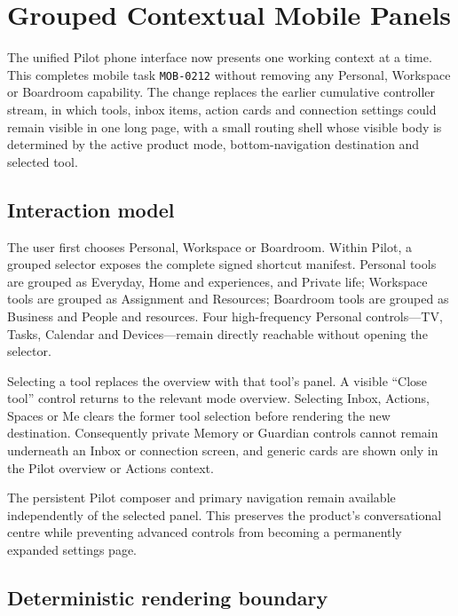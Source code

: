 \section{Grouped Contextual Mobile Panels}
\label{sec:pilot-mobile-contextual-panels}

The unified Pilot phone interface now presents one working context at a time.  This
completes mobile task \texttt{MOB-0212} without removing any Personal, Workspace or
Boardroom capability.  The change replaces the earlier cumulative controller stream,
in which tools, inbox items, action cards and connection settings could remain visible
in one long page, with a small routing shell whose visible body is determined by the
active product mode, bottom-navigation destination and selected tool.

\subsection{Interaction model}

The user first chooses Personal, Workspace or Boardroom.  Within Pilot, a grouped
selector exposes the complete signed shortcut manifest.  Personal tools are grouped
as Everyday, Home and experiences, and Private life; Workspace tools are grouped as
Assignment and Resources; Boardroom tools are grouped as Business and People and
resources.  Four high-frequency Personal controls---TV, Tasks, Calendar and
Devices---remain directly reachable without opening the selector.

Selecting a tool replaces the overview with that tool's panel.  A visible ``Close
tool'' control returns to the relevant mode overview.  Selecting Inbox, Actions,
Spaces or Me clears the former tool selection before rendering the new destination.
Consequently private Memory or Guardian controls cannot remain underneath an Inbox or
connection screen, and generic cards are shown only in the Pilot overview or Actions
context.

The persistent Pilot composer and primary navigation remain available independently
of the selected panel.  This preserves the product's conversational centre while
preventing advanced controls from becoming a permanently expanded settings page.

\subsection{Deterministic rendering boundary}

